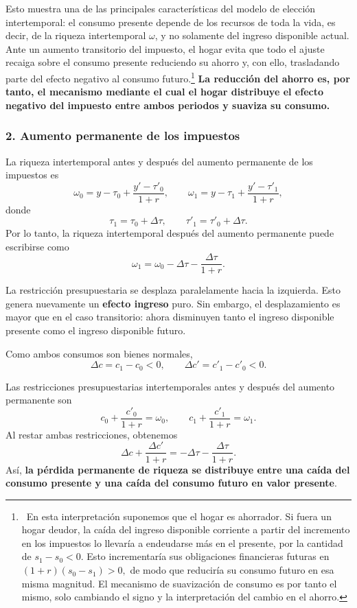\documentclass[11pt]{article}
\begin{document}
Esto muestra una de las principales características del modelo de elección intertemporal: el consumo presente depende de los recursos de toda la vida, es decir, de la riqueza intertemporal \(\omega\), y no solamente del ingreso disponible actual. Ante un aumento transitorio del impuesto, el hogar evita que todo el ajuste recaiga sobre el consumo presente reduciendo su ahorro y, con ello, trasladando parte del efecto negativo al consumo futuro.\footnote{\ En esta interpretación suponemos que el hogar es ahorrador. Si fuera un hogar deudor, la caída del ingreso disponible corriente a partir del incremento en los impuestos lo llevaría a endeudarse más en el presente, por la cantidad de  \(s_1-s_0<0\). Esto incrementaría sus obligaciones financieras futuras en
$
  (1+r)(s_0-s_1)>0,
$
de modo que reduciría su consumo futuro en esa misma magnitud. El mecanismo de suavización de consumo es por tanto el mismo, solo cambiando el signo y la interpretación del cambio en el ahorro.} \textbf{La reducción del ahorro es, por tanto, el mecanismo mediante el cual el hogar distribuye el efecto negativo del impuesto entre ambos periodos y suaviza su consumo.}







\subsubsection*{2. Aumento permanente de los impuestos}

La riqueza intertemporal antes y después del aumento permanente de los impuestos es
\[
  \omega_0
  =
  y-\tau_0+\frac{y'-\tau'_0}{1+r},
  \qquad
  \omega_1
  =
  y-\tau_1+\frac{y'-\tau'_1}{1+r},
\]
donde
\[
  \tau_1=\tau_0+\Delta\tau,
  \qquad
  \tau'_1=\tau'_0+\Delta\tau.
\]
Por lo tanto, la riqueza intertemporal después del aumento permanente puede escribirse como
\[
  \omega_1
  =
  \omega_0
  -
  \Delta\tau
  -
  \frac{\Delta\tau}{1+r}.
\]

La restricción presupuestaria se desplaza paralelamente hacia la izquierda. Esto genera nuevamente un \textbf{efecto ingreso} puro. Sin embargo, el desplazamiento es mayor que en el caso transitorio: ahora disminuyen tanto el ingreso disponible presente como el ingreso disponible futuro.

Como ambos consumos son bienes normales,
\[
  \Delta c=c_1-c_0<0,
  \qquad
  \Delta c'=c'_1-c'_0<0.
\]

Las restricciones presupuestarias intertemporales antes y después del aumento permanente son
\[
  c_0+\frac{c'_0}{1+r}=\omega_0,
  \qquad
  c_1+\frac{c'_1}{1+r}=\omega_1.
\]
Al restar ambas restricciones, obtenemos
\[
  \Delta c+\frac{\Delta c'}{1+r}
  =
  -\Delta\tau-\frac{\Delta\tau}{1+r}.
\]
Así, \textbf{la pérdida permanente de riqueza se distribuye entre una caída del consumo presente y una caída del consumo futuro en valor presente}.
\end{document}

